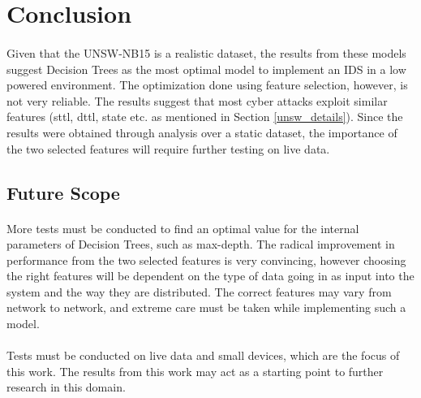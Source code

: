 \section{Conclusion}

\paragraph{}
Given that the UNSW-NB15 is a realistic dataset, the results from these models suggest Decision Trees as the most optimal model to implement an IDS in a low powered environment. The optimization done using feature selection, however, is not very reliable. The results suggest that most cyber attacks exploit similar features (sttl, dttl, state etc. as mentioned in Section \ref{unsw_details}). Since the results were obtained through analysis over a static dataset, the importance of the two selected features will require further testing on live data.

\subsection{Future Scope}

\paragraph{}
 More tests must be conducted to find an optimal value for the internal parameters of Decision Trees, such as max-depth. The radical improvement in performance from the two selected features is very convincing, however choosing the right features will be dependent on the type of data going in as input into the system and the way they are distributed. The correct features may vary from network to network, and extreme care must be taken while implementing such a model.

\paragraph{}
Tests must be conducted on live data and small devices, which are the focus of this work. The results from this work may act as a starting point to further research in this domain.
